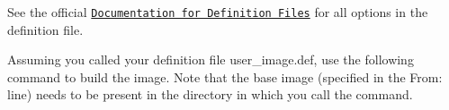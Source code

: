 See the official \href{https://sylabs.io/guides/3.6/user-guide/definition_files.html}{\tt Documentation for Definition Files} for all options in the definition file.

Assuming you called your definition file {\ttfamily user\+\_\+image.\+def}, use the following command to build the image. Note that the base image (specified in the {\ttfamily From\+:} line) needs to be present in the directory in which you call the command. 
 